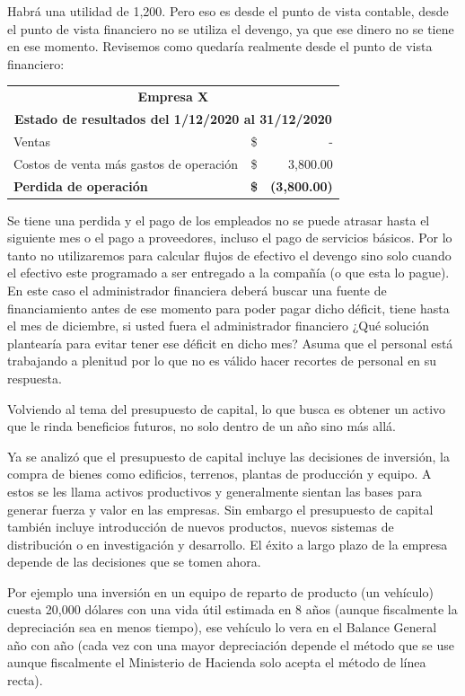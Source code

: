 \documentclass[12pt, a4paper]{article}
\begin{document}
Habrá una utilidad de 1,200. Pero eso es desde el punto de vista contable, desde el punto de vista financiero no se utiliza el devengo, ya que ese dinero no se tiene en ese momento. Revisemos como quedaría realmente desde el punto de vista financiero:

\begin{center}
\begin{tabular}{|l|c|r|}
\hline
\multicolumn{3}{|c|}{\textbf{Empresa X}} \\
\multicolumn{3}{|c|}{\textbf{Estado de resultados del 1/12/2020 al 31/12/2020}} \\
\hline
Ventas & \$ & - \\
\hline
Costos de venta más gastos de operación & \$ & 3,800.00 \\
\hline
\textbf{Perdida de operación} & \textbf{\$} & \textbf{(3,800.00)} \\
\hline
\end{tabular}
\end{center}

Se tiene una perdida y el pago de los empleados no se puede atrasar hasta el siguiente mes o el pago a proveedores, incluso el pago de servicios básicos. Por lo tanto no utilizaremos para calcular flujos de efectivo el devengo sino solo cuando el efectivo este programado a ser entregado a la compañía (o que esta lo pague). En este caso el administrador financiera deberá buscar una fuente de financiamiento antes de ese momento para poder pagar dicho déficit, tiene hasta el mes de diciembre, si usted fuera el administrador financiero ¿Qué solución plantearía para evitar tener ese déficit en dicho mes? Asuma que el personal está trabajando a plenitud por lo que no es válido hacer recortes de personal en su respuesta.

Volviendo al tema del presupuesto de capital, lo que busca es obtener un activo que le rinda beneficios futuros, no solo dentro de un año sino más allá.

Ya se analizó que el presupuesto de capital incluye las decisiones de inversión, la compra de bienes como edificios, terrenos, plantas de producción y equipo. A estos se les llama activos productivos y generalmente sientan las bases para generar fuerza y valor en las empresas. Sin embargo el presupuesto de capital también incluye introducción de nuevos productos, nuevos sistemas de distribución o en investigación y desarrollo. El éxito a largo plazo de la empresa depende de las decisiones que se tomen ahora.

Por ejemplo una inversión en un equipo de reparto de producto (un vehículo) cuesta 20,000 dólares con una vida útil estimada en 8 años (aunque fiscalmente la depreciación sea en menos tiempo), ese vehículo lo vera en el Balance General año con año (cada vez con una mayor depreciación depende el método que se use aunque fiscalmente el Ministerio de Hacienda solo acepta el método de línea recta).
\end{document}
